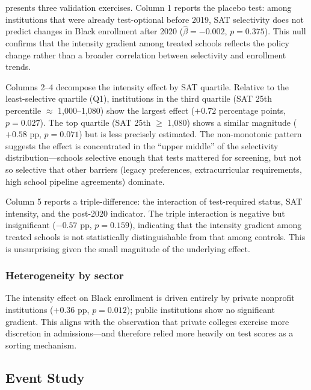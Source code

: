 \documentclass[12pt]{article}
\begin{document}
 presents three validation exercises. Column 1 reports the placebo test: among institutions that were already test-optional before 2019, SAT selectivity does not predict changes in Black enrollment after 2020 ($\hat{\beta} = -0.002$, $p = 0.375$). This null confirms that the intensity gradient among treated schools reflects the policy change rather than a broader correlation between selectivity and enrollment trends.

Columns 2--4 decompose the intensity effect by SAT quartile. Relative to the least-selective quartile (Q1), institutions in the third quartile (SAT 25th percentile $\approx$ 1,000--1,080) show the largest effect ($+0.72$ percentage points, $p = 0.027$). The top quartile (SAT 25th $\geq$ 1,080) shows a similar magnitude ($+0.58$ pp, $p = 0.071$) but is less precisely estimated. The non-monotonic pattern suggests the effect is concentrated in the ``upper middle'' of the selectivity distribution---schools selective enough that tests mattered for screening, but not so selective that other barriers (legacy preferences, extracurricular requirements, high school pipeline agreements) dominate.

Column 5 reports a triple-difference: the interaction of test-required status, SAT intensity, and the post-2020 indicator. The triple interaction is negative but insignificant ($-0.57$ pp, $p = 0.159$), indicating that the intensity gradient among treated schools is not statistically distinguishable from that among controls. This is unsurprising given the small magnitude of the underlying effect.



\subsubsection*{Heterogeneity by sector} The intensity effect on Black enrollment is driven entirely by private nonprofit institutions ($+0.36$ pp, $p = 0.012$); public institutions show no significant gradient. This aligns with the observation that private colleges exercise more discretion in admissions---and therefore relied more heavily on test scores as a sorting mechanism.

\subsection{Event Study}
\label{sec:event_study}
\end{document}
